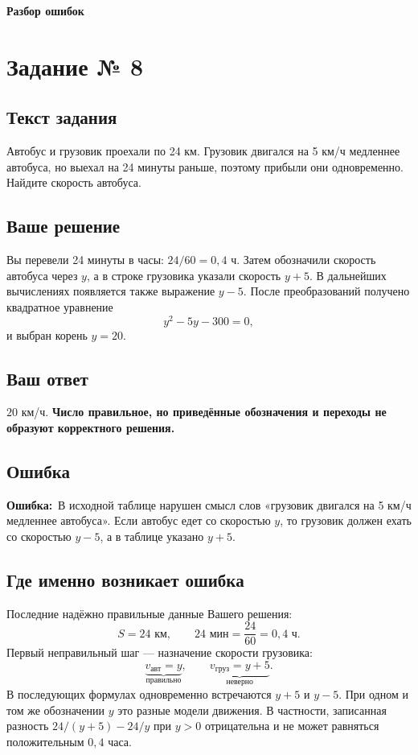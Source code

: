 \documentclass[a4paper,12pt]{article}
\newcommand{\errorlabel}{\textcolor{critical}{\textbf{Ошибка:}}}
\begin{document}
\newpage
\thispagestyle{empty}
\vspace*{\fill}
\begin{center}
{\Huge\bfseries\color{ink} Разбор ошибок}
\end{center}
\vspace*{\fill}
\newpage

\label{task:8}
\section*{Задание № 8}
\subsection*{Текст задания}
Автобус и грузовик проехали по 24 км. Грузовик двигался на 5 км/ч медленнее автобуса, но выехал на 24 минуты раньше, поэтому прибыли они одновременно. Найдите скорость автобуса.

\subsection*{Ваше решение}
Вы перевели 24 минуты в часы: $24/60=0{,}4$ ч. Затем обозначили скорость автобуса через $y$, а в строке грузовика указали скорость $y+5$. В дальнейших вычислениях появляется также выражение $y-5$. После преобразований получено квадратное уравнение
\[
 y^2-5y-300=0,
\]
и выбран корень $y=20$.

\subsection*{Ваш ответ}
$20$ км/ч. \textbf{Число правильное, но приведённые обозначения и переходы не образуют корректного решения.}

\subsection*{Ошибка}
\errorlabel\ В исходной таблице нарушен смысл слов «грузовик двигался на 5 км/ч медленнее автобуса». Если автобус едет со скоростью $y$, то грузовик должен ехать со скоростью $y-5$, а в таблице указано $y+5$.

\subsection*{Где именно возникает ошибка}
Последние надёжно правильные данные Вашего решения:
\[
 S=24\text{ км},\qquad 24\text{ мин}=\frac{24}{60}=0{,}4\text{ ч}.
\]
Первый неправильный шаг --- назначение скорости грузовика:
\[
 \underbrace{v_{\text{авт}}=y}_{\text{правильно}},\qquad
 \underbrace{v_{\text{груз}}=y+5}_{\text{неверно}}.
\]
В последующих формулах одновременно встречаются $y+5$ и $y-5$. При одном и том же обозначении $y$ это разные модели движения. В частности, записанная разность $24/(y+5)-24/y$ при $y>0$ отрицательна и не может равняться положительным $0{,}4$ часа.
\end{document}
